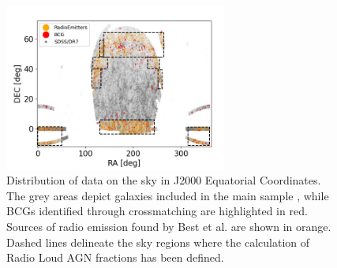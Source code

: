 \begin{figure}[hbtp]
  \centering
  \includegraphics[width=0.65\textwidth]{Fourth}
  \caption{Distribution of data on the sky in J2000 Equatorial Coordinates. The grey areas depict galaxies included in the main sample \cite{mpa-sdss-dr7}, while BCGs identified through crossmatching are highlighted in red. Sources of radio emission found by Best et al. \cite{2005MNRAS.362....9B} are shown in orange. Dashed lines delineate the sky regions where the calculation of Radio Loud AGN fractions has been defined. }
  \label{8}
\end{figure}


 
